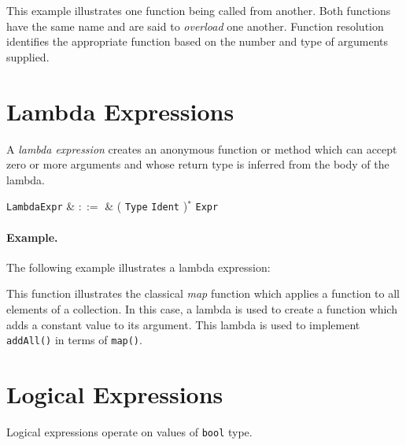 This example illustrates one function being called from another.  Both functions have the same name and are said to {\em overload} one another.  Function resolution identifies the appropriate function based on the number and type of arguments supplied.  


\section{Lambda Expressions}
\label{c_expr_lambda}

A {\em lambda expression} creates an anonymous function or method which can accept zero or more arguments and whose return type is inferred from the body of the lambda.

\begin{syntax}
  \verb+LambdaExpr+ & $::=$ & \token{\&} \token{(} \big( \verb+Type+ \verb+Ident+ \big)$^*$ \token{->} \verb+Expr+ \token{)}\\
\end{syntax}

\paragraph{Example.}

The following example illustrates a lambda expression:



This function illustrates the classical {\em map} function which applies a function to all elements of a collection.  In this case, a lambda is used to create a function which adds a constant value to its argument.  This lambda is used to implement \lstinline{addAll()} in terms of \lstinline{map()}.


\section{Logical Expressions}
\label{c_expr_logical}

Logical expressions operate on values of \lstinline{bool} type.

